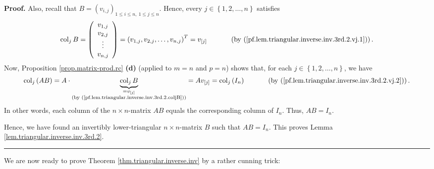 \documentclass[numbers=enddot,12pt,final,onecolumn,notitlepage]{scrartcl}%
\theoremstyle{definition}
\newenvironment{proof}[1][Proof]{\noindent\textbf{#1.} }{\ \rule{0.5em}{0.5em}}
\begin{document}
\begin{proof}
Also, recall that $B=\left(  v_{i,j}\right)  _{1\leq i\leq n,\ 1\leq j\leq n}%
$. Hence, every $j\in\left\{  1,2,\ldots,n\right\}  $ satisfies%
\begin{equation}
\operatorname*{col}\nolimits_{j}B=\left(
\begin{array}
[c]{c}%
v_{1,j}\\
v_{2,j}\\
\vdots\\
v_{n,j}%
\end{array}
\right)  =\left(  v_{1,j},v_{2,j},\ldots,v_{n,j}\right)  ^{T}=v_{\left[
j\right]  }\ \ \ \ \ \ \ \ \ \ \left(  \text{by
(\ref{pf.lem.triangular.inverse.inv.3rd.2.vj.1})}\right)  .
\label{pf.lem.triangular.inverse.inv.3rd.2.coljB}%
\end{equation}
Now, Proposition \ref{prop.matrix-prod.rc} \textbf{(d)} (applied to $m=n$ and
$p=n$) shows that, for each $j\in\left\{  1,2,\ldots,n\right\}  $, we have%
\[
\operatorname*{col}\nolimits_{j}\left(  AB\right)  =A\cdot
\underbrace{\operatorname*{col}\nolimits_{j}B}_{\substack{=v_{\left[
j\right]  }\\\text{(by (\ref{pf.lem.triangular.inverse.inv.3rd.2.coljB}))}%
}}=Av_{\left[  j\right]  }=\operatorname*{col}\nolimits_{j}\left(
I_{n}\right)  \ \ \ \ \ \ \ \ \ \ \left(  \text{by
(\ref{pf.lem.triangular.inverse.inv.3rd.2.vj.2})}\right)  .
\]
In other words, each column of the $n\times n$-matrix $AB$ equals the
corresponding column of $I_{n}$. Thus, $AB=I_{n}$.

Hence, we have found an invertibly lower-triangular $n\times n$-matrix $B$
such that $AB=I_{n}$. This proves Lemma \ref{lem.triangular.inverse.inv.3rd.2}.
\end{proof}

We are now ready to prove Theorem \ref{thm.triangular.inverse.inv} by a rather
cunning trick:
\end{document}
